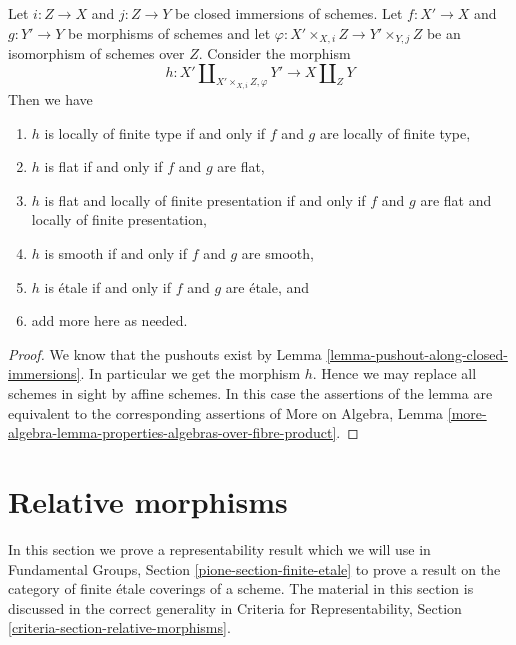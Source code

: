 \begin{lemma}
\label{lemma-pushout-along-closed-immersions-properties-above}
Let $i : Z \to X$ and $j : Z \to Y$ be closed immersions of schemes.
Let $f : X' \to X$ and $g : Y' \to Y$ be morphisms of schemes and let
$\varphi : X' \times_{X, i} Z \to Y' \times_{Y, j} Z$
be an isomorphism of schemes over $Z$. Consider the morphism
$$
h :
X' \amalg_{X' \times_{X, i} Z, \varphi} Y'
\longrightarrow
X \amalg_Z Y
$$
Then we have
\begin{enumerate}
\item $h$ is locally of finite type if and only if $f$ and $g$ are
locally of finite type,
\item $h$ is flat if and only if $f$ and $g$ are flat,
\item $h$ is flat and locally of finite presentation if and only if
$f$ and $g$ are flat and locally of finite presentation,
\item $h$ is smooth if and only if $f$ and $g$ are smooth,
\item $h$ is \'etale if and only if $f$ and $g$ are \'etale, and
\item add more here as needed.
\end{enumerate}
\end{lemma}

\begin{proof}
We know that the pushouts exist by
Lemma \ref{lemma-pushout-along-closed-immersions}.
In particular we get the morphism $h$.
Hence we may replace all schemes in sight by
affine schemes. In this case the assertions of the lemma
are equivalent to the corresponding assertions of
More on Algebra, Lemma
\ref{more-algebra-lemma-properties-algebras-over-fibre-product}.
\end{proof}





\section{Relative morphisms}
\label{section-relative-morphisms}

\noindent
In this section we prove a representability result which we will use in
Fundamental Groups, Section \ref{pione-section-finite-etale}
to prove a result on the category of finite \'etale coverings of a scheme.
The material in this section is discussed in the correct
generality in Criteria for Representability, Section
\ref{criteria-section-relative-morphisms}.


